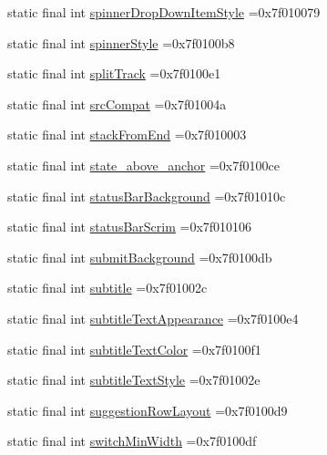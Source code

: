 \begin{DoxyCompactItemize}
\item 
static final int \hyperlink{classproject4_1_1xaria_1_1R_1_1attr_a3e33fb61a801b75cdf8fee8b1831b1e6}{spinner\+Drop\+Down\+Item\+Style} =0x7f010079
\item 
static final int \hyperlink{classproject4_1_1xaria_1_1R_1_1attr_af6301b118c4b70a4d89b9bd65ee934eb}{spinner\+Style} =0x7f0100b8
\item 
static final int \hyperlink{classproject4_1_1xaria_1_1R_1_1attr_a7c3388ed165d038075d0fad48083db41}{split\+Track} =0x7f0100e1
\item 
static final int \hyperlink{classproject4_1_1xaria_1_1R_1_1attr_aaaf0f9e139982ba4a4b3100d2f1d9b53}{src\+Compat} =0x7f01004a
\item 
static final int \hyperlink{classproject4_1_1xaria_1_1R_1_1attr_a093289194d9cb73a8e247eb80a312f0b}{stack\+From\+End} =0x7f010003
\item 
static final int \hyperlink{classproject4_1_1xaria_1_1R_1_1attr_aafca5c6e6c806873aac364507cc7dee5}{state\+\_\+above\+\_\+anchor} =0x7f0100ce
\item 
static final int \hyperlink{classproject4_1_1xaria_1_1R_1_1attr_a260e6049b07e1460374b1f0531f5b159}{status\+Bar\+Background} =0x7f01010c
\item 
static final int \hyperlink{classproject4_1_1xaria_1_1R_1_1attr_a758289560ae42afd69011d542f163e80}{status\+Bar\+Scrim} =0x7f010106
\item 
static final int \hyperlink{classproject4_1_1xaria_1_1R_1_1attr_a9b0e755b1af717c09653bfc7dcbfe443}{submit\+Background} =0x7f0100db
\item 
static final int \hyperlink{classproject4_1_1xaria_1_1R_1_1attr_a0529bd3b1311a5ee0ad81ea51a1913ad}{subtitle} =0x7f01002c
\item 
static final int \hyperlink{classproject4_1_1xaria_1_1R_1_1attr_a6c8f5549820dff757872c167a8fd7bfd}{subtitle\+Text\+Appearance} =0x7f0100e4
\item 
static final int \hyperlink{classproject4_1_1xaria_1_1R_1_1attr_ae26675919e34b608bcbf0cae7faef3aa}{subtitle\+Text\+Color} =0x7f0100f1
\item 
static final int \hyperlink{classproject4_1_1xaria_1_1R_1_1attr_a97c5a3d1486c37fd9e9afd92f3a388bf}{subtitle\+Text\+Style} =0x7f01002e
\item 
static final int \hyperlink{classproject4_1_1xaria_1_1R_1_1attr_a1fb6b8140eb66beeab933d6152af10c3}{suggestion\+Row\+Layout} =0x7f0100d9
\item 
static final int \hyperlink{classproject4_1_1xaria_1_1R_1_1attr_a52a618aeddd088b56bd168027af2f1eb}{switch\+Min\+Width} =0x7f0100df

\end{DoxyCompactItemize}
